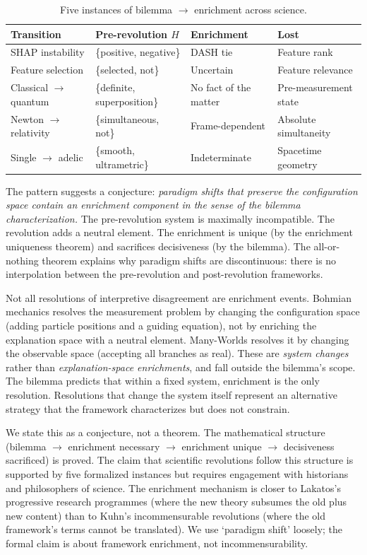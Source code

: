 \documentclass[11pt,a4paper]{article}
\begin{document}
\begin{table}[h]
\centering
\small
\caption{Five instances of bilemma $\to$ enrichment across science.}
\label{tab:revolutions}
\begin{tabular}{@{}llll@{}}
\toprule
Transition & Pre-revolution $H$ & Enrichment & Lost \\
\midrule
SHAP instability & \{positive, negative\} & DASH tie & Feature rank \\
Feature selection & \{selected, not\} & Uncertain & Feature relevance \\
Classical $\to$ quantum & \{definite, superposition\} & No fact of the matter & Pre-measurement state \\
Newton $\to$ relativity & \{simultaneous, not\} & Frame-dependent & Absolute simultaneity \\
Single $\to$ adelic & \{smooth, ultrametric\} & Indeterminate & Spacetime geometry \\
\bottomrule
\end{tabular}
\end{table}

The pattern suggests a conjecture: \emph{paradigm shifts that preserve the
configuration space contain an enrichment component in the sense of the
bilemma characterization.}
The pre-revolution system is maximally incompatible. The revolution adds a
neutral element. The enrichment is unique (by the enrichment uniqueness
theorem) and sacrifices decisiveness (by the bilemma). The all-or-nothing
theorem explains why paradigm shifts are discontinuous: there is no
interpolation between the pre-revolution and post-revolution frameworks.

Not all resolutions of interpretive disagreement are enrichment events. Bohmian mechanics resolves the measurement problem by changing the configuration space (adding particle positions and a guiding equation), not by enriching the explanation space with a neutral element. Many-Worlds resolves it by changing the observable space (accepting all branches as real). These are \emph{system changes} rather than \emph{explanation-space enrichments}, and fall outside the bilemma's scope. The bilemma predicts that within a fixed system, enrichment is the only resolution. Resolutions that change the system itself represent an alternative strategy that the framework characterizes but does not constrain.

We state this as a conjecture, not a theorem. The mathematical structure
(bilemma $\to$ enrichment necessary $\to$ enrichment unique $\to$ decisiveness
sacrificed) is proved. The claim that scientific revolutions follow this
structure is supported by five formalized instances but requires engagement
with historians and philosophers of science.  The enrichment mechanism is closer to Lakatos's progressive research programmes (where the new theory subsumes the old plus new content) than to Kuhn's incommensurable revolutions (where the old framework's terms cannot be translated). We use `paradigm shift' loosely; the formal claim is about framework enrichment, not incommensurability.
\end{document}
